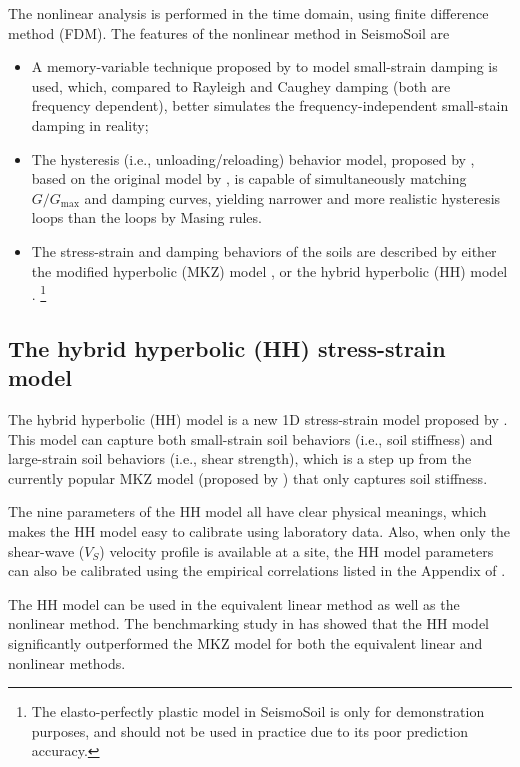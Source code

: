 \documentclass[11pt,letterpaper]{article}
\begin{document}
The nonlinear analysis is performed in the time domain, using finite difference method (FDM). The features of the nonlinear method in SeismoSoil are
\begin{itemize}
	\item A memory-variable technique proposed by \cite{LiuPC_Archuleta_2006} to model small-strain damping is used, which, compared to Rayleigh and Caughey damping (both are frequency dependent), better simulates the frequency-independent small-stain damping in reality;
	
	\item The hysteresis (i.e., unloading/reloading) behavior model, proposed by \cite{Li_Assimaki_2010_BSSA}, based on the original model by \cite{Muravskii_2005}, is capable of simultaneously matching $G/G_{\max}$ and damping curves, yielding narrower and more realistic hysteresis loops than the loops by Masing rules.
	
	\item The stress-strain and damping behaviors of the soils are described by either the modified hyperbolic (MKZ) model \citep{Matasovic_Vucetic_1993}, or the hybrid hyperbolic (HH) model \citep{Shi_Asimaki_2017}. \footnote{The elasto-perfectly plastic model in SeismoSoil is only for demonstration purposes, and should not be used in practice due to its poor prediction accuracy.}
\end{itemize}

\subsection{The hybrid hyperbolic (HH) stress-strain model}\label{sec:HH_model}

The hybrid hyperbolic (HH) model is a new 1D stress-strain model proposed by \cite{Shi_Asimaki_2017}. This model can capture both small-strain soil behaviors (i.e., soil stiffness) and large-strain soil behaviors (i.e., shear strength), which is a step up from the currently popular MKZ model (proposed by \citealp{Matasovic_Vucetic_1993}) that only captures soil stiffness.

The nine parameters of the HH model all have clear physical meanings, which makes the HH model easy to calibrate using laboratory data. Also, when only the shear-wave ($V_S$) velocity profile is available at a site, the HH model parameters can also be calibrated using the empirical correlations listed in the Appendix of \cite{Shi_Asimaki_2017}.

The HH model can be used in the equivalent linear method as well as the nonlinear method. The benchmarking study in \cite{Shi_Asimaki_2017} has showed that the HH model significantly outperformed the MKZ model for both the equivalent linear and nonlinear methods.
\end{document}
